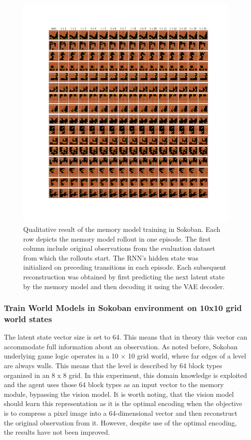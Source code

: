 \begin{figure}[H]
\includegraphics[width=1\textwidth,keepaspectratio]{figures/Sokoban_memory.png}
\caption[Qualitative result of the memory model training in Sokoban]{Qualitative result of the memory model training in Sokoban. Each row depicts the memory model rollout in one episode. The first column include original observations from the evaluation dataset from which the rollouts start. The RNN's hidden state was initialized on preceding transitions in each episode. Each subsequent reconstruction was obtained by first predicting the next latent state by the memory model and then decoding it using the VAE decoder.}
\label{Fig.Sokoban_memory}
\end{figure}

\subsubsection{Train World Models in Sokoban environment on 10x10 grid world states}

The latent state vector size is set to 64. This means that in theory this vector can accommodate full information about an observation. As noted before, Sokoban underlying game logic operates in a 10 × 10 grid world, where far edges of a level are always walls. This means that the level is described by 64 block types organized in an 8 x 8 grid. In this experiment, this domain knowledge is exploited and the agent uses those 64 block types as an input vector to the memory module, bypassing the vision model. It is worth noting, that the vision model should learn this representation as it is the optimal encoding when the objective is to compress a pixel image into a 64-dimensional vector and then reconstruct the original observation from it. However, despite use of the optimal encoding, the results have not been improved.

